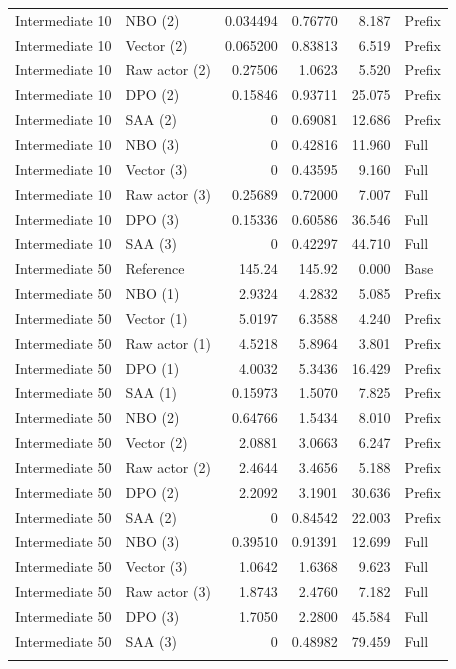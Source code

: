 \begin{longtable}{llrrrl}
Intermediate 10 & NBO (2) & 0.034494 & 0.76770 & 8.187 & Prefix\\
Intermediate 10 & Vector (2) & 0.065200 & 0.83813 & 6.519 & Prefix\\
Intermediate 10 & Raw actor (2) & 0.27506 & 1.0623 & 5.520 & Prefix\\
Intermediate 10 & DPO (2) & 0.15846 & 0.93711 & 25.075 & Prefix\\
Intermediate 10 & SAA (2) & 0 & 0.69081 & 12.686 & Prefix\\
Intermediate 10 & NBO (3) & 0 & 0.42816 & 11.960 & Full\\
Intermediate 10 & Vector (3) & 0 & 0.43595 & 9.160 & Full\\
Intermediate 10 & Raw actor (3) & 0.25689 & 0.72000 & 7.007 & Full\\
Intermediate 10 & DPO (3) & 0.15336 & 0.60586 & 36.546 & Full\\
Intermediate 10 & SAA (3) & 0 & 0.42297 & 44.710 & Full\\
\addlinespace
Intermediate 50 & Reference & 145.24 & 145.92 & 0.000 & Base\\
Intermediate 50 & NBO (1) & 2.9324 & 4.2832 & 5.085 & Prefix\\
Intermediate 50 & Vector (1) & 5.0197 & 6.3588 & 4.240 & Prefix\\
Intermediate 50 & Raw actor (1) & 4.5218 & 5.8964 & 3.801 & Prefix\\
Intermediate 50 & DPO (1) & 4.0032 & 5.3436 & 16.429 & Prefix\\
Intermediate 50 & SAA (1) & 0.15973 & 1.5070 & 7.825 & Prefix\\
Intermediate 50 & NBO (2) & 0.64766 & 1.5434 & 8.010 & Prefix\\
Intermediate 50 & Vector (2) & 2.0881 & 3.0663 & 6.247 & Prefix\\
Intermediate 50 & Raw actor (2) & 2.4644 & 3.4656 & 5.188 & Prefix\\
Intermediate 50 & DPO (2) & 2.2092 & 3.1901 & 30.636 & Prefix\\
Intermediate 50 & SAA (2) & 0 & 0.84542 & 22.003 & Prefix\\
Intermediate 50 & NBO (3) & 0.39510 & 0.91391 & 12.699 & Full\\
Intermediate 50 & Vector (3) & 1.0642 & 1.6368 & 9.623 & Full\\
Intermediate 50 & Raw actor (3) & 1.8743 & 2.4760 & 7.182 & Full\\
Intermediate 50 & DPO (3) & 1.7050 & 2.2800 & 45.584 & Full\\
Intermediate 50 & SAA (3) & 0 & 0.48982 & 79.459 & Full\\
\addlinespace
\end{longtable}\normalsize
